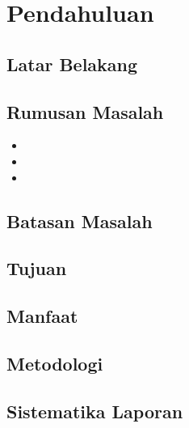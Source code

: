 \chapter{Pendahuluan}
    \section{Latar Belakang}
        \Blindtext[5][1]
    \section{Rumusan Masalah}
        \begin{itemize}
            \item \Blindtext[1][1]
            \item \Blindtext[1][1]
            \item \Blindtext[1][1]
        \end{itemize}
    \section{Batasan Masalah}
    \section{Tujuan}
    \section{Manfaat}
    \section{Metodologi}
    \section{Sistematika Laporan}
    \cleardoublepage
